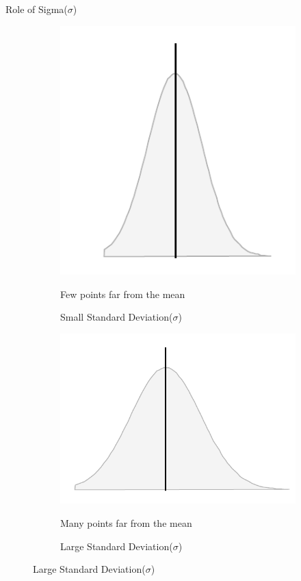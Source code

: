 \documentclass[10pt,dvipsnames, aspectratio=169]{beamer}
\begin{document}
\begin{frame}[t]{Role of Sigma($\sigma$)}
	\begin{figure}[h]
		\centering
		\begin{subfigure}{0.45\textwidth}
			\centering
			\includegraphics[scale=0.5]{eda/std1.png}
			\caption{Small Standard Deviation($\sigma$)}
			Few points far from the mean
		\end{subfigure}
		\hfil
		\begin{subfigure}{0.45\textwidth}
			\centering
			\includegraphics[scale=0.5]{eda/std2.png}
			\caption{ Large Standard Deviation($\sigma$)}
			Many points far from the mean
			
		\end{subfigure}
		
	\end{figure}
\end{frame}
\end{document}
